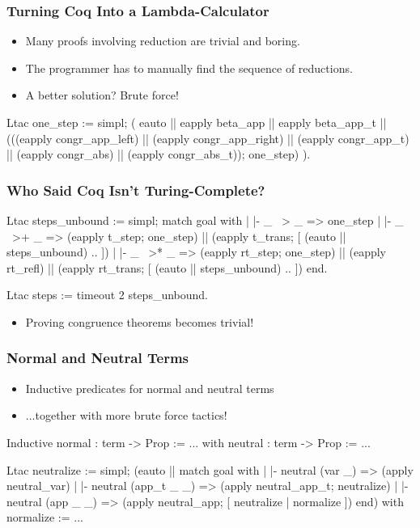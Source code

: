\documentclass{beamer}
\begin{document}
\begin{frame}[fragile]
\frametitle{Turning Coq Into a Lambda-Calculator}
\begin{itemize}
  \item Many proofs involving reduction are trivial and boring.
  \item The programmer has to manually find the sequence of reductions.
  \item A better solution? Brute force!
\end{itemize}

\begin{pyglist}[fontsize=\scriptsize]
Ltac one_step :=
  simpl; (
    eauto
      || eapply beta_app
      || eapply beta_app_t
      || (((eapply congr_app_left)
             || (eapply congr_app_right)
             || (eapply congr_app_t)
             || (eapply congr_abs)
             || (eapply congr_abs_t)); one_step)
  ).
\end{pyglist}
\end{frame}

\begin{frame}[fragile]
\frametitle{Who Said Coq Isn't Turing-Complete?}
\begin{pyglist}[fontsize=\scriptsize]
Ltac steps_unbound :=
  simpl;
  match goal with
    | |- _ ~> _ => one_step
    | |- _ ~>+ _ =>
      (eapply t_step; one_step) 
      || (eapply t_trans; [ (eauto || steps_unbound) .. ])
    | |- _ ~>* _ =>
      (eapply rt_step; one_step) || (eapply rt_refl) 
      || (eapply rt_trans; [ (eauto || steps_unbound) .. ])
  end.

Ltac steps := timeout 2 steps_unbound.
\end{pyglist}
\begin{itemize}
  \item Proving congruence theorems becomes trivial!
\end{itemize}
\end{frame}

\begin{frame}[fragile]
\frametitle{Normal and Neutral Terms}
\begin{itemize}
  \item Inductive predicates for normal and neutral terms
  \item ...together with more brute force tactics!
\end{itemize}

\begin{pyglist}[fontsize=\scriptsize]
Inductive normal : term -> Prop :=
...
with neutral : term -> Prop :=
...

Ltac neutralize :=
  simpl;
  (eauto
     || match goal with
          | |- neutral (var _) => 
          (apply neutral_var)
          | |- neutral (app_t _ _) => 
          (apply neutral_app_t; neutralize)
          | |- neutral (app _ _) => 
          (apply neutral_app; [ neutralize | normalize ])
        end)
  with normalize := ...
\end{pyglist}
\end{frame}
\end{document}
